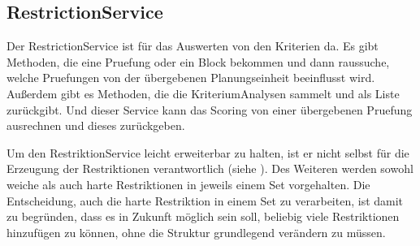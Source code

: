 \subsection{RestrictionService}\label{subsec:RestrictionService}
Der RestrictionService ist für das Auswerten von den Kriterien da.
Es gibt Methoden, die eine Pruefung oder ein Block bekommen und dann raussuche, welche Pruefungen
von der übergebenen Planungseinheit beeinflusst wird.
Außerdem gibt es Methoden, die die KriteriumAnalysen sammelt und als Liste zurückgibt.
Und dieser Service kann das Scoring von einer übergebenen Pruefung ausrechnen und dieses zurückgeben.

Um den RestriktionService leicht erweiterbar zu halten, ist er nicht selbst für die Erzeugung der Restriktionen
verantwortlich (siehe ).
Des Weiteren werden sowohl weiche als auch harte Restriktionen in jeweils einem Set vorgehalten.
Die Entscheidung, auch die harte Restriktion in einem Set zu verarbeiten, ist damit zu begründen, dass
es in Zukunft möglich sein soll, beliebig viele Restriktionen hinzufügen zu können, ohne die Struktur
grundlegend verändern zu müssen.